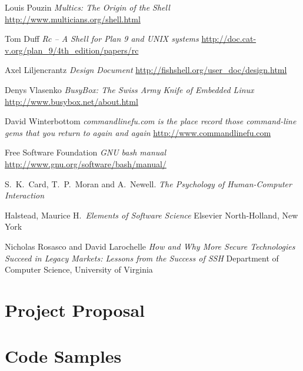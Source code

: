 \documentclass[12pt,twoside,notitlepage]{report}
\begin{document}
\begin{thebibliography}{9} %

  Louis Pouzin
  \emph{Multics: The Origin of the Shell}
  \url{http://www.multicians.org/shell.html}

  Tom Duff
  \emph{Rc -- A Shell for Plan 9 and UNIX systems}
  \url{http://doc.cat-v.org/plan\_9/4th\_edition/papers/rc}

  Axel Liljencrantz
  \emph{Design Document}
  \url{http://fishshell.org/user\_doc/design.html}

  Denys Vlasenko
  \emph{BusyBox: The Swiss Army Knife of Embedded Linux}
  \url{http://www.busybox.net/about.html}

  David Winterbottom
  \emph{commandlinefu.com is the place record those command-line gems that
  you return to again and again}
  \url{http://www.commandlinefu.com}

  Free Software Foundation
  \emph{GNU bash manual}
  \url{http://www.gnu.org/software/bash/manual/}

  S.\ K.\ Card, T.\ P.\ Moran and A.\ Newell. 
  \emph{The Psychology of Human-Computer Interaction}

  Halstead, Maurice H.\ 
  \emph{Elements of Software Science}
  Elsevier North-Holland, New York

  Nicholas Rosasco and David Larochelle
  \emph{How and Why More Secure Technologies Succeed in Legacy
  Markets: Lessons from the Success of SSH}
  Department of Computer Science, University of Virginia   

\end{thebibliography}
\cleardoublepage

\appendix

\chapter{Project Proposal}

\parindent 0pt
\parskip 6pt


\chapter{Code Samples}
\end{document}
